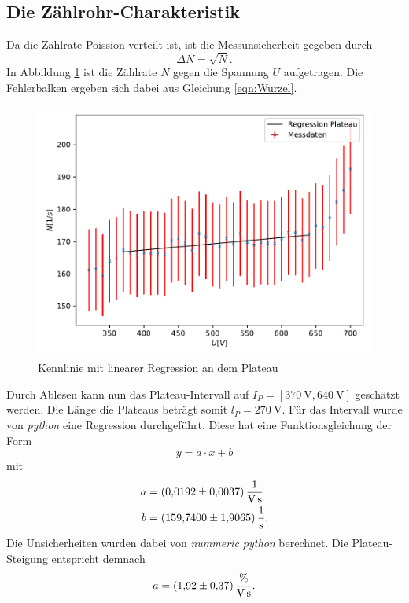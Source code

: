 \subsection{Die Zählrohr-Charakteristik}
\label{subsec:Charakteristik}
Da die Zählrate Poission verteilt ist, ist die Messunsicherheit gegeben durch 
\begin{equation}
    \Delta N=\sqrt{N}. \label{eqn:Wurzel}
\end{equation}
In Abbildung \ref{fig:Kennlinie} ist die Zählrate $N$ gegen die Spannung $U$ aufgetragen. Die Fehlerbalken
ergeben sich dabei aus Gleichung \ref{eqn:Wurzel}.
\begin{figure}[H]
    \centering
    \includegraphics[scale=0.8]{auswertung/plot1.pdf}
    \caption{Kennlinie mit linearer Regression an dem Plateau}
    \label{fig:Kennlinie}
  \end{figure}
  \noindent Durch Ablesen kann nun das Plateau-Intervall auf $I_{P}=[\SI{370}{\volt}, \SI{640}{\volt}]$ geschätzt werden.
  Die Länge die Plateaus beträgt somit $l_{P}=\SI{270}{\volt}$. Für das Intervall 
  wurde von \textit{python} eine Regression durchgeführt. Diese hat eine Funktionsgleichung der Form
  \begin{equation}
      y=a\cdot x+b \label{eqn:gerade}
  \end{equation} 
  mit
  \begin{align*}
    a &= \SI{0.0192 \pm 0.0037}{\per\volt\per\second}\\
    b &= \SI{159.74 \pm 1.9065}{\per\second}.
  \end{align*}
  Die Unsicherheiten wurden dabei von  \textit{nummeric python} berechnet.
  Die Plateau-Steigung entspricht demnach
  \begin{equation*}
    a = \SI{1.92 \pm 0.37}{\percent\per\volt\per\second}.
  \end{equation*}

